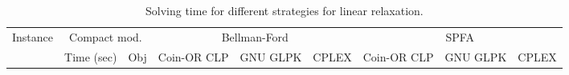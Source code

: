 \documentclass{article}
\begin{document}
\begin{landscape}

\begin{table}[!htb]
   \footnotesize
   \caption{Solving time for different strategies for linear relaxation.}
   \centering
   \begin{tabular}{rrrrrrrrr}
      \toprule

      \multirow{2}{*}{Instance} &
      \multicolumn{2}{c}{Compact mod.} &
      \multicolumn{3}{c}{Bellman-Ford} &
      \multicolumn{3}{c}{SPFA}\\

      \cmidrule(lr){2-3}
      \cmidrule(lr){4-6}
      \cmidrule(lr){7-9}

      &
      Time (sec) & Obj &
      Coin-OR CLP &
      GNU GLPK &
      CPLEX &
      Coin-OR CLP &
      GNU GLPK &
      CPLEX \\

      \midrule


\end{tabular}
\end{table}
\end{landscape}
\end{document}
